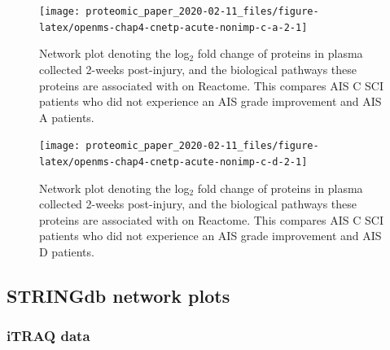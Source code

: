 \documentclass[9pt,lineno]{elife}
\newcommand{\blandscape}{\begin{landscape}}
\newcommand{\elandscape}{\end{landscape}}
\begin{document}
\begin{landscape}
\begin{landscape}
\begin{landscape}
\begin{landscape}
\begin{landscape}
\begin{figure}

{\centering \texttt{[image: proteomic\_paper\_2020-02-11\_files/figure-latex/openms-chap4-cnetp-acute-nonimp-c-a-2-1]} 

}

\caption[Network plot - label-free - Acute A VS Acute C Non-Improvers]{Network plot denoting the log\(_2\) fold change of proteins in plasma collected 2-weeks post-injury, and the biological pathways these proteins are associated with on Reactome. This compares AIS C SCI patients who did not experience an AIS grade improvement and AIS A patients.}\label{fig:openms-chap4-cnetp-acute-nonimp-c-a-2}
\end{figure}

\elandscape
\blandscape



\begin{figure}

{\centering \texttt{[image: proteomic\_paper\_2020-02-11\_files/figure-latex/openms-chap4-cnetp-acute-nonimp-c-d-2-1]} 

}

\caption[Network plot - label-free - Acute C Non-Improvers VS Acute D]{Network plot denoting the log\(_2\) fold change of proteins in plasma collected 2-weeks post-injury, and the biological pathways these proteins are associated with on Reactome. This compares AIS C SCI patients who did not experience an AIS grade improvement and AIS D patients.}\label{fig:openms-chap4-cnetp-acute-nonimp-c-d-2}
\end{figure}

\end{landscape}

\hypertarget{sup-string-plots}{%
\subsection{STRINGdb network plots}\label{sup-string-plots}}

\hypertarget{itraq-data-2}{%
\subsubsection{iTRAQ data}\label{itraq-data-2}}




\end{landscape}
\end{landscape}
\end{landscape}
\end{landscape}
\end{document}
